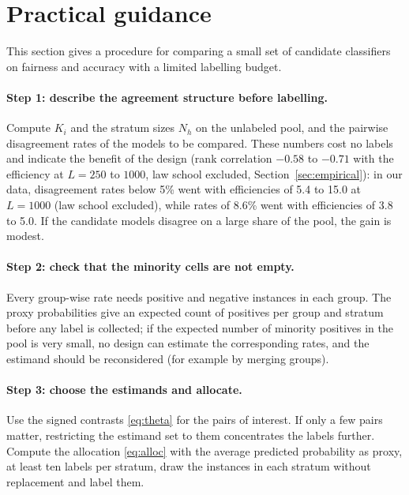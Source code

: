 \section{Practical guidance}\label{sec:guidance}

This section gives a procedure for comparing a small set of candidate classifiers on fairness and accuracy with a limited labelling budget.

\paragraph{Step 1: describe the agreement structure before labelling.} Compute $K_i$ and the stratum sizes $N_h$ on the unlabeled pool, and the pairwise disagreement rates of the models to be compared. These numbers cost no labels and indicate the benefit of the design (rank correlation $-0.58$ to $-0.71$ with the efficiency at $L=250$ to $1000$, law school excluded, Section~\ref{sec:empirical}): in our data, disagreement rates below 5\% went with efficiencies of 5.4 to 15.0 at $L=1000$ (law school excluded), while rates of 8.6\% went with efficiencies of 3.8 to 5.0. If the candidate models disagree on a large share of the pool, the gain is modest.

\paragraph{Step 2: check that the minority cells are not empty.} Every group-wise rate needs positive and negative instances in each group. The proxy probabilities give an expected count of positives per group and stratum before any label is collected; if the expected number of minority positives in the pool is very small, no design can estimate the corresponding rates, and the estimand should be reconsidered (for example by merging groups).

\paragraph{Step 3: choose the estimands and allocate.} Use the signed contrasts \eqref{eq:theta} for the pairs of interest. If only a few pairs matter, restricting the estimand set to them concentrates the labels further. Compute the allocation \eqref{eq:alloc} with the average predicted probability as proxy, at least ten labels per stratum, draw the instances in each stratum without replacement and label them.

